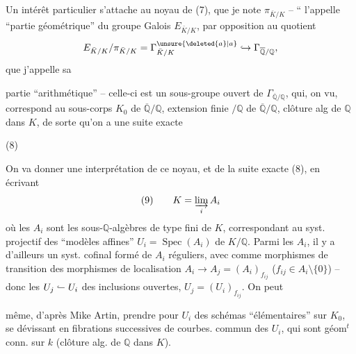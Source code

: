 Un intérêt particulier s'attache au noyau de (7), que je note $\pi_{\bar K/K}$ -- `` l'appelle ``partie géométrique'' du groupe Galois $E_{\bar K/K}$, par opposition au quotient
\[
E_{\bar K/K}/\pi_{\bar K/K}=\Gamma^{\unsure{\deleted{a}|a}}_{\bar K/K}\hookrightarrow\Gamma_{\overline{\mathbb Q}/\mathbb Q},
\]
que j'appelle sa

partie ``arithmétique'' -- celle-ci est un sous-groupe ouvert de $\Gamma_{\overline{\mathbb Q}/\mathbb Q}$, qui, on  vu, correspond au sous-corps $K_0$ de $\overline{\mathbb Q}/\mathbb Q$,  extension finie $/\mathbb Q$ de $\overline{\mathbb Q}/\mathbb Q$, clôture alg de $\mathbb Q$ dans $K$, de sorte qu'on a une suite exacte

\noindent (8)\quad{}

On va donner une interprétation de ce noyau, et de la suite exacte (8), en écrivant
\[
(9)\qquad K=\varinjlim_i A_i
\]
où les $A_i$ sont les sous-$\mathbb Q$-algèbres de type fini de $K$, correspondant au syst. projectif des ``modèles affines'' $U_i=\operatorname{Spec}(A_i)$ de $K/\mathbb Q$. Parmi les $A_i$, il y a d'ailleurs un syst. cofinal formé de $A_i$ réguliers,  avec comme morphismes de transition des morphismes de localisation $A_i\longrightarrow A_j=(A_i)_{f_{ij}}$ ($f_{ij}\in A_i\setminus\{0\}$) -- donc les $U_j\lhook\joinrel\relbar U_i$ des inclusions ouvertes, $U_j=(U_i)_{f_{ij}}$. On peut

même, d'après Mike Artin, prendre pour $U_i$ des schémas ``élémentaires'' sur $K_0$, se dévissant en fibrations successives de courbes.   commun des $U_i$, qui sont géom$^t$ conn.  sur  $k$ (clôture alg. de $\mathbb Q$ dans $K$).

